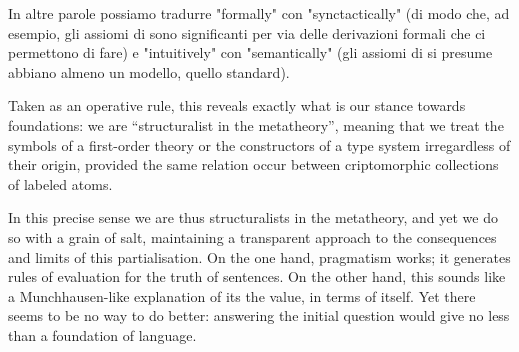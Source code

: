 In altre parole possiamo tradurre "formally" con "synctactically" (di modo che, ad esempio, gli assiomi di  sono significanti per via delle derivazioni formali che ci permettono di fare) e "intuitively" con "semantically" (gli assiomi di  si presume abbiano almeno un modello, quello standard).

Taken as an operative rule, this reveals exactly what is our stance towards foundations: we are ``structuralist in the metatheory'', meaning that we treat the symbols of a first-order theory or the constructors of a type system irregardless of their origin, provided the same relation occur between criptomorphic collections of labeled atoms.

In this precise sense we are thus structuralists in the metatheory, and yet we do so with a grain of salt, maintaining a transparent approach to the consequences and limits of this partialisation. On the one hand, pragmatism works; %
it generates rules of evaluation for the truth of sentences. On the other hand, this sounds like a Munchhausen-like explanation of its the value, in terms of itself. Yet there seems to be no way to do better: answering the initial question would give no less than a foundation of language.

